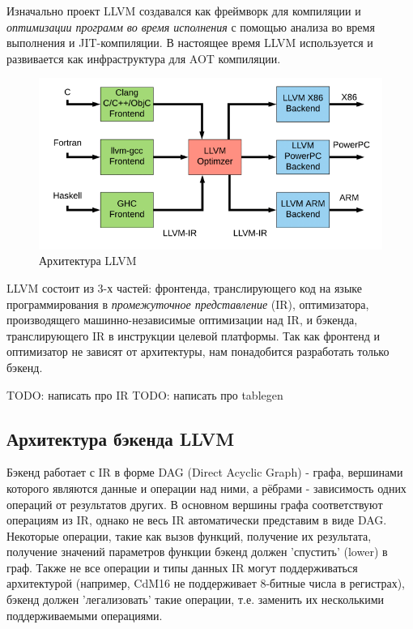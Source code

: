 \documentclass[a4paper,14pt]{extarticle}
\begin{document}
Изначально проект LLVM создавался как фреймворк для компиляции и \emph{оптимизации программ во время исполнения} с помощью анализа во время выполнения и JIT-компиляции\cite{LLVM:CGO04}. В настоящее время LLVM используется и развивается как инфраструктура для AOT компиляции.
\begin{figure}[!h]
	\begin{center}
		\includegraphics[width=\textwidth]{LLVM-Compiler-Development-architecture.png}
		\caption{Архитектура LLVM \cite{llvmpic}}
	\end{center}
\end{figure}

LLVM состоит из 3-х частей: фронтенда, транслирующего код на языке программирования в \emph{промежуточное представление} (IR), оптимизатора, производящего машинно-независимые оптимизации над IR, и бэкенда, транслирующего IR в инструкции целевой платформы. Так как фронтенд и оптимизатор не зависят от архитектуры, нам %
понадобится разработать только бэкенд.

TODO: написать про IR %
TODO: написать про tablegen

\subsection{Архитектура бэкенда LLVM}

Бэкенд работает с IR в форме DAG (Direct Acyclic Graph) - графа, вершинами которого являются данные и операции над ними, а рёбрами - зависимость одних операций от результатов других. В основном вершины графа соответствуют операциям из IR, однако не весь IR автоматически представим в виде DAG. Некоторые операции, такие как вызов функций, получение их результата, получение значений параметров функции бэкенд должен 'спустить' (lower) в граф. Также не все операции и типы данных IR могут поддерживаться архитектурой (например, CdM16 не поддерживает 8-битные числа в регистрах), бэкенд должен 'легализовать' такие операции, т.е. заменить их несколькими поддерживаемыми операциями. %
\end{document}
